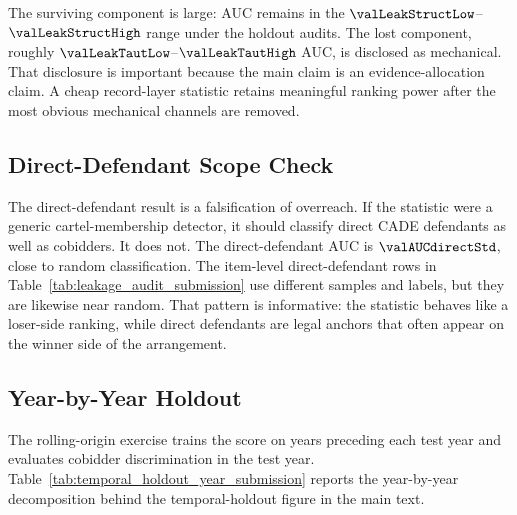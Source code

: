 The surviving component is large: AUC remains in the
$\valLeakStructLow$--$\valLeakStructHigh$ range under the
holdout audits. The lost component, roughly
$\valLeakTautLow$--$\valLeakTautHigh$ AUC, is disclosed as
mechanical. That disclosure is important because the main claim
is an evidence-allocation claim. A cheap record-layer statistic
retains meaningful ranking power after the most obvious
mechanical channels are removed.

\subsection{Direct-Defendant Scope Check}
\label{app:direct_scope_submission}

The direct-defendant result is a falsification of overreach. If
the statistic were a generic cartel-membership detector, it
should classify direct CADE defendants as well as cobidders. It
does not. The direct-defendant AUC is $\valAUCdirectStd$, close
to random classification. The item-level direct-defendant rows
in Table~\ref{tab:leakage_audit_submission} use different
samples and labels, but they are likewise near random. That
pattern is informative: the
statistic behaves like a loser-side ranking, while direct
defendants are legal anchors that often appear on the winner side
of the arrangement.

\subsection{Year-by-Year Holdout}
\label{app:year_holdout_submission}

The rolling-origin exercise trains the score on years preceding
each test year and evaluates cobidder discrimination in the test
year. Table~\ref{tab:temporal_holdout_year_submission} reports the
year-by-year decomposition behind the temporal-holdout figure in
the main text.

